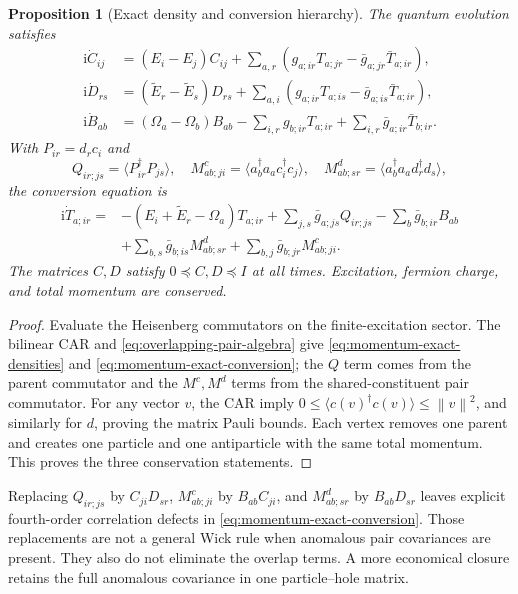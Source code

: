 \documentclass[11pt,a4paper,oneside]{book}
\theoremstyle{plain}
\newtheorem{proposition}[theorem]{Proposition}
\theoremstyle{definition}
\theoremstyle{remark}
\newcommand{\ii}{\mathrm i}
\newcommand{\norm}[1]{\left\lVert#1\right\rVert}
\newcommand{\src}[2]{\cite{#1}}
\begin{document}
\begin{proposition}[Exact density and conversion hierarchy]
\label{prop:momentum-exact-hierarchy}
The quantum evolution satisfies
\begin{equation}
 \begin{split}
 \ii\dot C_{ij}&=(E_i-E_j)C_{ij}
 +\sum_{a,r}(g_{a;ir}T_{a;jr}-\bar g_{a;jr}\bar T_{a;ir}),\\
 \ii\dot D_{rs}&=(\widetilde E_r-\widetilde E_s)D_{rs}
 +\sum_{a,i}(g_{a;ir}T_{a;is}-\bar g_{a;is}\bar T_{a;ir}),\\
 \ii\dot B_{ab}&=(\Omega_a-\Omega_b)B_{ab}
 -\sum_{i,r}g_{b;ir}T_{a;ir}
 +\sum_{i,r}\bar g_{a;ir}\bar T_{b;ir}.
 \end{split}
 \label{eq:momentum-exact-densities}
\end{equation}
With $P_{ir}=d_rc_i$ and
\[
 Q_{ir;js}=\langle P_{ir}^\dagger P_{js}\rangle,\quad
 M^c_{ab;ji}=\langle a_b^\dagger a_a c_i^\dagger c_j\rangle,\quad
 M^d_{ab;sr}=\langle a_b^\dagger a_a d_r^\dagger d_s\rangle,
\]
the conversion equation is
\begin{equation}
 \begin{split}
 \ii\dot T_{a;ir}={}&-(E_i+\widetilde E_r-\Omega_a)T_{a;ir}
 +\sum_{j,s}\bar g_{a;js}Q_{ir;js}-\sum_b\bar g_{b;ir}B_{ab}\\
 &+\sum_{b,s}\bar g_{b;is}M^d_{ab;sr}
 +\sum_{b,j}\bar g_{b;jr}M^c_{ab;ji}.
 \end{split}
 \label{eq:momentum-exact-conversion}
\end{equation}
The matrices $C,D$ satisfy $0\preceq C,D\preceq I$ at all times.
Excitation, fermion charge, and total momentum are conserved.
\end{proposition}
\begin{proof}
Evaluate the Heisenberg commutators on the finite-excitation sector.
The bilinear CAR and \eqref{eq:overlapping-pair-algebra} give
\eqref{eq:momentum-exact-densities} and
\eqref{eq:momentum-exact-conversion}; the $Q$ term comes from the
parent commutator and the $M^c,M^d$ terms from the shared-constituent
pair commutator.  For any vector $v$, the CAR imply
$0\le\langle c(v)^\dagger c(v)\rangle\le\norm v^2$, and similarly
for $d$, proving the matrix Pauli bounds.  Each vertex removes one
parent and creates one particle and one antiparticle with the same
total momentum.  This proves the three conservation statements.
\end{proof}
\src{R20}{thm:v20v69-densities,thm:v20v69-conversion,prop:v20v69-conservation}

Replacing $Q_{ir;js}$ by $C_{ji}D_{sr}$,
$M^c_{ab;ji}$ by $B_{ab}C_{ji}$, and
$M^d_{ab;sr}$ by $B_{ab}D_{sr}$ leaves explicit fourth-order
correlation defects in \eqref{eq:momentum-exact-conversion}.
Those replacements are not a general Wick rule when anomalous pair
covariances are present.  They also do not eliminate the overlap
terms.  A more economical closure retains the full anomalous
covariance in one particle--hole matrix.
\end{document}
